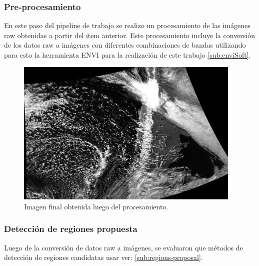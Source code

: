 \subsubsection*{Pre-procesamiento}
En este paso del pipeline de trabajo se realizo un procesamiento de las imágenes raw obtenidas a partir del item anterior. Este procesamiento incluye la conversión de los datos raw a imágenes con diferentes combinaciones de bandas utilizando para esto la herramienta ENVI para la realización de este trabajo \ref{sub:enviSoft}.	

\begin{figure}[H] \centering
  \includegraphics[height=7cm,keepaspectratio=true,clip=true]{imagenes/tbd/pre-img.png}
  \caption{Imagen final obtenida luego del procesamiento.}\label{Fig:img-final}
\end{figure}

\subsubsection*{Detección de regiones propuesta}
Luego de la conversión de datos raw a imágenes, se evaluaron que métodos de detección de regiones candidatas usar ver: \ref{sub:regions-proposal}.

